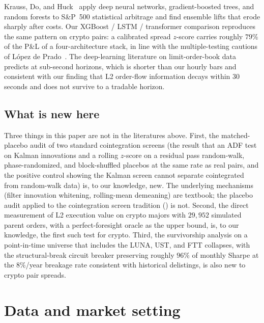 \documentclass[11pt]{article}
\begin{document}
Krauss, Do, and Huck~\cite{krauss2017deep} apply deep neural networks, gradient-boosted
trees, and random forests to S\&P~500 statistical arbitrage and find ensemble lifts that
erode sharply after costs. Our XGBoost / LSTM / transformer comparison reproduces the same
pattern on crypto pairs: a calibrated spread $z$-score carries roughly $79\%$ of the P\&L of
a four-architecture stack, in line with the multiple-testing cautions of L\'opez de
Prado~\cite{lopezdeprado2018advances}. The deep-learning literature on limit-order-book
data predicts at sub-second horizons, which is shorter than our hourly bars and consistent
with our finding that L2 order-flow information decays within $30$ seconds and does not
survive to a tradable horizon.

\subsection{What is new here}
\label{sec:related-novelty}

Three things in this paper are not in the literatures above. First, the matched-placebo
audit of two standard cointegration screens (the result that an ADF test on Kalman
innovations and a rolling $z$-score on a residual pass random-walk, phase-randomized, and
block-shuffled placebos at the same rate as real pairs, and the positive control showing
the Kalman screen cannot separate cointegrated from random-walk data) is, to our
knowledge, new. The underlying mechanisms (filter innovation whitening, rolling-mean
demeaning) are textbook; the placebo audit applied to the cointegration screen tradition
(\cite{vidyamurthy2004pairs, elliott2005pairs, triantafyllopoulos2011dynamic}) is not.
Second, the direct measurement of L2 execution value on crypto majors with $29{,}952$
simulated parent orders, with a perfect-foresight oracle as the upper bound, is, to our
knowledge, the first such test for crypto. Third, the survivorship analysis on a
point-in-time universe that includes the LUNA, UST, and FTT collapses, with the
structural-break circuit breaker preserving roughly $96\%$ of monthly Sharpe at the $8\%$/year
breakage rate consistent with historical delistings, is also new to crypto pair spreads.

\section{Data and market setting}
\label{sec:methods}
\end{document}

